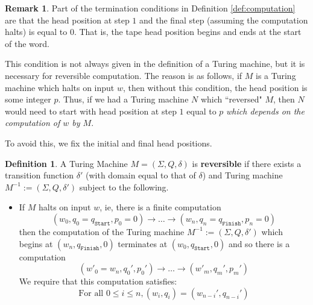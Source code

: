 \documentclass[12pt]{article}
\theoremstyle{plain}
\theoremstyle{definition}
\newtheorem{defn}[thm]{Definition} %
\newtheorem{remark}[thm]{Remark}
\newcommand{\lto}{\longrightarrow}
\begin{document}
	\begin{remark}
		Part of the termination conditions in Definition \ref{def:computation} are that the head position at step $1$ and the final step (assuming the computation halts) is equal to $0$. That is, the tape head position begins and ends at the start of the word.
		
		This condition is not always given in the definition of a Turing machine, but it is necessary for reversible computation. The reason is as follows, if $M$ is a Turing machine which halts on input $w$, then without this condition, the head position is some integer $p$. Thus, if we had a Turing machine $N$ which ``reversed" $M$, then $N$ would need to start with head position at step $1$ equal to $p$ \emph{which depends on the computation of $w$ by $M$}.
		
		To avoid this, we fix the initial and final head positions.
	\end{remark}
	
	\begin{defn}\label{def:reversible_machine}
		A Turing Machine $M = (\Sigma, Q, \delta)$ is \textbf{reversible} if there exists a transition function $\delta'$ (with domain equal to that of $\delta$) and Turing machine $M^{-1} := (\Sigma, Q, \delta')$ subject to the following.
		\begin{itemize}
			\item If $M$ halts on input $w$, ie, there is a finite computation
			\begin{equation}
				(w_0, q_0 = q_{\texttt{Start}}, p_0 = 0) \lto \ldots \lto (w_n, q_n = q_\texttt{Finish}, p_n = 0)
			\end{equation}
			then the computation of the Turing machine $M^{-1} := (\Sigma, Q, \delta')$ which begins at $(w_n, q_{\texttt{Finish}}, 0)$ terminates at $(w_0, q_{\texttt{Start}}, 0)$ and so there is a computation
			\begin{equation}
				(w'_0 = w_n, q_0', p_0') \lto \ldots \lto (w'_m, q_m', p_m')
			\end{equation}	
			We require that this computation satisfies:
			\begin{equation}
				\text{For all }0 \leq i \leq n, (w_i, q_i) = (w_{n-i}', q_{n-i}')
				\end{equation}
		\end{itemize}
	\end{defn}
\end{document}

